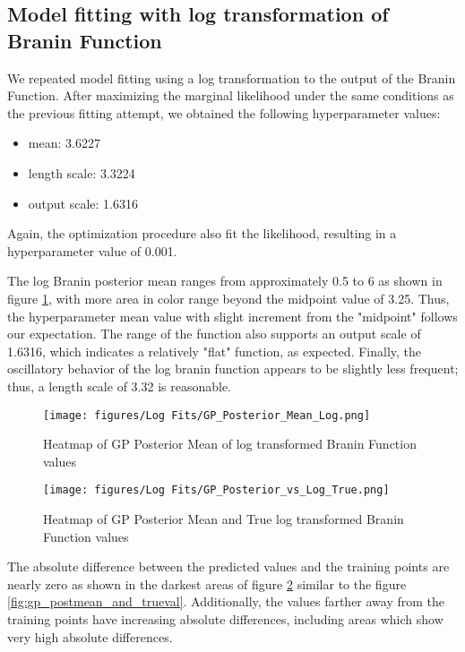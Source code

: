 \documentclass[11pt]{article}
\numberwithin{equation}{section}
\begin{document}
\subsection*{Model fitting with log transformation of Branin Function}
We repeated model fitting using a log transformation to the output of the Branin Function. After maximizing the marginal likelihood under the same conditions as the previous fitting attempt, we obtained the following hyperparameter values:
\begin{itemize}
  \item
    mean: 3.6227
  \item
    length scale: 3.3224
  \item
    output scale: 1.6316
\end{itemize}
Again, the optimization procedure also fit the likelihood, resulting in a hyperparameter value of 0.001.

The log Branin posterior mean ranges from approximately 0.5 to 6 as shown in figure \ref{fig:gp_post_mean_log}, with more area in color range beyond the midpoint value of 3.25. Thus, the hyperparameter mean value with slight increment from the "midpoint" follows our expectation. The range of the function also supports an output scale of 1.6316, which indicates a relatively "flat" function, as expected. Finally, the oscillatory behavior of the log branin function appears to be slightly less frequent; thus, a length scale of 3.32 is reasonable. 

\begin{figure}[H]
  \centering
  \texttt{[image: figures/Log Fits/GP\_Posterior\_Mean\_Log.png]}
  \caption{Heatmap of GP Posterior Mean of log transformed Branin Function values}
  \label{fig:gp_post_mean_log}
\end{figure}

\begin{figure}[H]
  \centering
  \texttt{[image: figures/Log Fits/GP\_Posterior\_vs\_Log\_True.png]}
  \caption{Heatmap of GP Posterior Mean and True log transformed Branin Function values}
  \label{fig:gp_post_mean_true_log}
\end{figure}
The absolute difference between the predicted values and the training points are nearly zero as shown in the darkest areas of figure \ref{fig:gp_post_mean_true_log} similar to the figure \ref{fig:gp_postmean_and_trueval}. Additionally, the values farther away from the training points have increasing absolute differences, including areas which show very high absolute differences.
\end{document}
